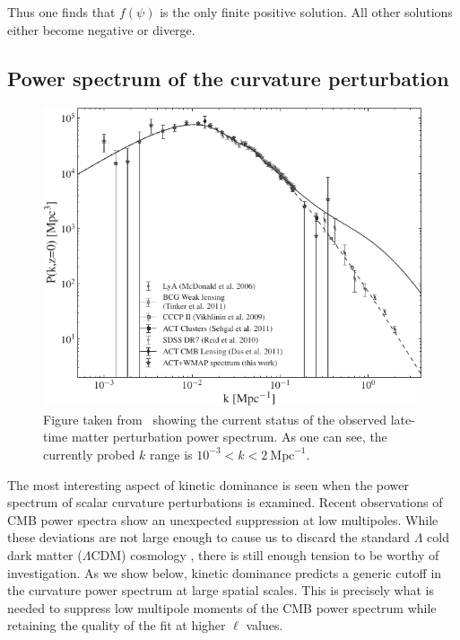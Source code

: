 Thus one finds that \(f(\psi)\) is the only finite positive solution.  All other solutions either become negative or diverge.




\subsection{Power spectrum of the curvature perturbation}
\label{sec:powspec}
\begin{figure}[tp]
  \centering
  \includegraphics[width=\textwidth]{chapters/kinetic_dominance/figures/powerspec}
  \caption{Figure taken from~\protect\cite{hlozek_atacama_2012} showing the current status of the observed late-time matter perturbation power spectrum. As one can see, the currently probed \(k\) range is \(10^{-3}<k<2\:\mathrm{Mpc}^{-1}\).}\label{fig:experimental_power_spectrum}
\end{figure}

The most interesting aspect of kinetic dominance is seen when the power spectrum of scalar curvature perturbations is examined. Recent observations of CMB power spectra \citep{hinshaw_nine-year_2012,planck_collaboration_planck_2013} show an unexpected suppression at low multipoles. While these deviations are not large enough to cause us to discard the standard \(\Lambda\) cold dark matter (\(\Lambda\)CDM) cosmology \citep{1998PhRvD..57.2207B,2000PhRvD..62l3513B,2004PhRvD..69f3516D}, there is still enough tension to be worthy of investigation.  As we show below, kinetic dominance predicts a generic cutoff in the curvature power spectrum at large spatial scales. This is precisely what is needed to suppress low multipole moments of the CMB power spectrum while retaining the quality of the fit at higher \(\ell\) values.

